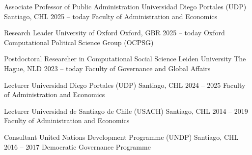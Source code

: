 






\begin{cventries}
\cventry
{Associate Professor of Public Administration} 
{Universidad Diego Portales (UDP)} 
{Santiago, CHL} 
{2025 -- today}
{Faculty of Administration and Economics} \vspace{1.5mm}

\cventry
{Research Leader} 
{University of Oxford} 
{Oxford, GBR} 
{2025 -- today}
{Oxford Computational Political Science Group (OCPSG)} \vspace{1.5mm}

\cventry
{Postdoctoral Researcher in Computational Social Science} 
{Leiden University} 
{The Hague, NLD} 
{2023 -- today}
{Faculty of Governance and Global Affairs} \vspace{1.5mm}

\cventry
{Lecturer} 
{Universidad Diego Portales (UDP)} 
{Santiago, CHL} 
{2024 -- 2025}
{Faculty of Administration and Economics} \vspace{1.5mm}

\cventry
{Lecturer} 
{Universidad de Santiago de Chile (USACH)} 
{Santiago, CHL} 
{2014 -- 2019}
{Faculty of Administration and Economics} \vspace{1.5mm}


\cventry
{Consultant} 
{United Nations Development Programme (UNDP)} 
{Santiago, CHL} 
{2016 -- 2017}
{Democratic Governance Programme} %

\end{cventries}

